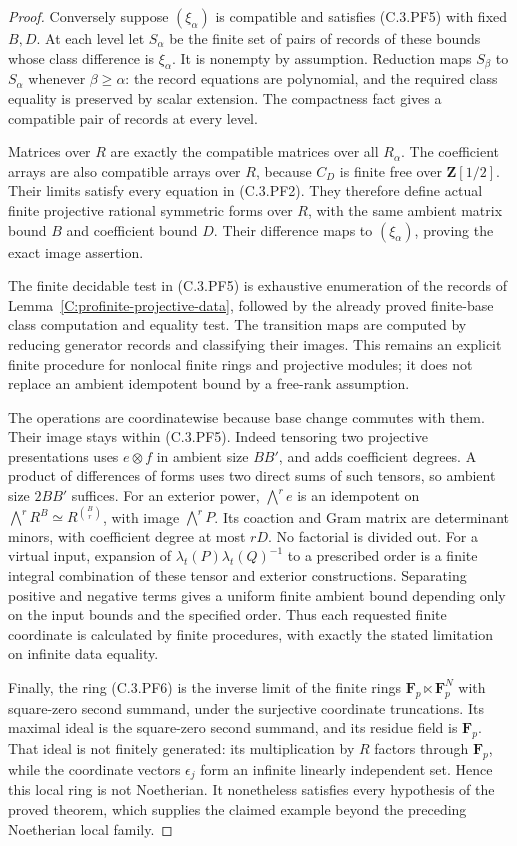 \begin{proof}
Conversely suppose $(\xi_\alpha)$ is compatible
and satisfies (C.3.PF5) with fixed $B,D$.
At each level let $S_\alpha$ be the finite set
of pairs of records of these bounds whose
class difference is $\xi_\alpha$.
It is nonempty by assumption.
Reduction maps $S_\beta$ to $S_\alpha$ whenever
$\beta\geq\alpha$: the record equations are
polynomial, and the required class equality
is preserved by scalar extension.
The compactness fact gives a compatible pair
of records at every level.

Matrices over $R$ are exactly the compatible
matrices over all $R_\alpha$.
The coefficient arrays are also compatible
arrays over $R$, because $C_D$ is finite free
over $\mathbf Z[1/2]$.
Their limits satisfy every equation in
(C.3.PF2). They therefore define actual
finite projective rational symmetric forms
over $R$, with the same ambient matrix bound
$B$ and coefficient bound $D$.
Their difference maps to $(\xi_\alpha)$,
proving the exact image assertion.

The finite decidable test in (C.3.PF5) is
exhaustive enumeration of the records of
Lemma~\ref{C:profinite-projective-data},
followed by the already proved finite-base
class computation and equality test.
The transition maps are computed by reducing
generator records and classifying their images.
This remains an explicit finite procedure for
nonlocal finite rings and projective modules;
it does not replace an ambient idempotent
bound by a free-rank assumption.

The operations are coordinatewise because
base change commutes with them.
Their image stays within (C.3.PF5).
Indeed tensoring two projective presentations
uses $e\otimes f$ in ambient size $BB'$,
and adds coefficient degrees.
A product of differences of forms uses
two direct sums of such tensors, so ambient
size $2BB'$ suffices.
For an exterior power, $\bigwedge^r e$
is an idempotent on
$\bigwedge^r R^B\simeq R^{\binom Br}$,
with image $\bigwedge^r P$.
Its coaction and Gram matrix are determinant
minors, with coefficient degree at most $rD$.
No factorial is divided out.
For a virtual input, expansion of
$\lambda_t(P)\lambda_t(Q)^{-1}$ to a prescribed
order is a finite integral combination of
these tensor and exterior constructions.
Separating positive and negative terms gives
a uniform finite ambient bound depending
only on the input bounds and the specified
order. Thus each requested finite coordinate
is calculated by finite procedures, with
exactly the stated limitation on infinite
data equality.

Finally, the ring (C.3.PF6) is the inverse
limit of the finite rings
$\mathbf F_p\ltimes\mathbf F_p^N$ with
square-zero second summand, under the
surjective coordinate truncations.
Its maximal ideal is the square-zero second
summand, and its residue field is $\mathbf F_p$.
That ideal is not finitely generated:
its multiplication by $R$ factors through
$\mathbf F_p$, while the coordinate vectors
$\epsilon_j$ form an infinite linearly
independent set. Hence this local ring
is not Noetherian. It nonetheless satisfies
every hypothesis of the proved theorem,
which supplies the claimed example beyond
the preceding Noetherian local family.
\end{proof}
